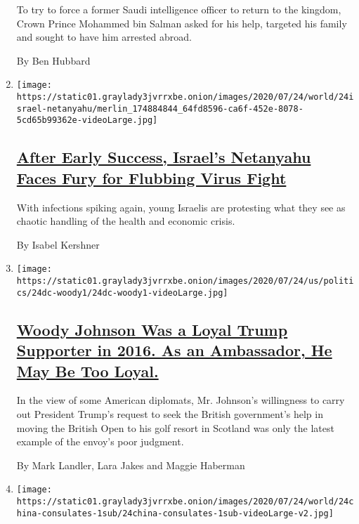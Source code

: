 \begin{enumerate}
  To try to force a former Saudi intelligence officer to return to the
  kingdom, Crown Prince Mohammed bin Salman asked for his help, targeted
  his family and sought to have him arrested abroad.

  By Ben Hubbard
\item
  \texttt{[image: https://static01.graylady3jvrrxbe.onion/images/2020/07/24/world/24israel-netanyahu/merlin\_174884844\_64fd8596-ca6f-452e-8078-5cd65b99362e-videoLarge.jpg]}

  \hypertarget{after-early-success-israels-netanyahu-faces-fury-for-flubbing-virus-fight}{%
  \subsection{\texorpdfstring{\href{/2020/07/24/world/middleeast/israel-virus-protests-netanyahu.html}{After
  Early Success, Israel's Netanyahu Faces Fury for Flubbing Virus
  Fight}}{After Early Success, Israel's Netanyahu Faces Fury for Flubbing Virus Fight}}\label{after-early-success-israels-netanyahu-faces-fury-for-flubbing-virus-fight}}

  With infections spiking again, young Israelis are protesting what they
  see as chaotic handling of the health and economic crisis.

  By Isabel Kershner
\item
  \texttt{[image: https://static01.graylady3jvrrxbe.onion/images/2020/07/24/us/politics/24dc-woody1/24dc-woody1-videoLarge.jpg]}

  \hypertarget{woody-johnson-was-a-loyal-trump-supporter-in-2016-as-an-ambassador-he-may-be-too-loyal}{%
  \subsection{\texorpdfstring{\href{/2020/07/24/world/europe/woody-johnson-trump.html}{Woody
  Johnson Was a Loyal Trump Supporter in 2016. As an Ambassador, He May
  Be Too
  Loyal.}}{Woody Johnson Was a Loyal Trump Supporter in 2016. As an Ambassador, He May Be Too Loyal.}}\label{woody-johnson-was-a-loyal-trump-supporter-in-2016-as-an-ambassador-he-may-be-too-loyal}}

  In the view of some American diplomats, Mr. Johnson's willingness to
  carry out President Trump's request to seek the British government's
  help in moving the British Open to his golf resort in Scotland was
  only the latest example of the envoy's poor judgment.

  By Mark Landler, Lara Jakes and Maggie Haberman
\item
  \texttt{[image: https://static01.graylady3jvrrxbe.onion/images/2020/07/24/world/24china-consulates-1sub/24china-consulates-1sub-videoLarge-v2.jpg]}


\end{enumerate}
